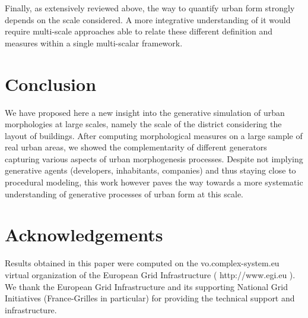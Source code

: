 \documentclass[letterpaper]{article}
\begin{document}
Finally, as extensively reviewed above, the way to quantify urban form strongly depends on the scale considered. A more integrative understanding of it would require multi-scale approaches able to relate these different definition and measures within a single multi-scalar framework.


\section{Conclusion}

We have proposed here a new insight into the generative simulation of urban morphologies at large scales, namely the scale of the district considering the layout of buildings. After computing morphological measures on a large sample of real urban areas, we showed the complementarity of different generators capturing various aspects of urban morphogenesis processes. Despite not implying generative agents (developers, inhabitants, companies) and thus staying close to procedural modeling, this work however paves the way towards a more systematic understanding of generative processes of urban form at this scale.



\section{Acknowledgements}

Results obtained in this paper were computed on the vo.complex-system.eu virtual organization of the European Grid Infrastructure ( http://www.egi.eu ). We thank the European Grid Infrastructure and its supporting National Grid Initiatives (France-Grilles in particular) for providing the technical support and infrastructure.
\end{document}
